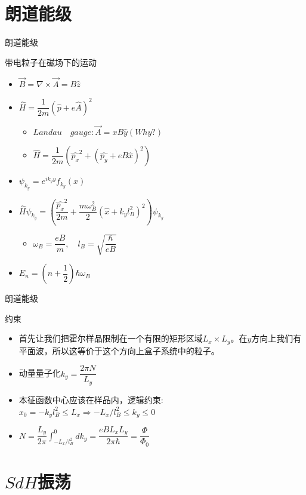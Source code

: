 \documentclass{beamer}
\begin{document}
\section{朗道能级}
\begin{frame}{朗道能级}
	\begin{block}{带电粒子在磁场下的运动}
		\begin{itemize}
			\item $\vec{B}=\nabla \times \vec{A}=B\hat{z}$
			\item $\hat{H}=\dfrac{1}{2m}(\hat{p}+e\hat{A})^{2}$
			\begin{itemize}
				\item $Landau\quad gauge:\vec{A}=xB\hat{y}(Why?)$
				\item $\hat{H}=\dfrac{1}{2m}(\hat{p_{x}}^{2}+(\hat{p_{y}}+eB\hat{x})^{2})$
			\end{itemize}
		\item $\psi_{k_{y}}=e^{ik_{y}y}f_{k_{y}}(x)$
		\item $\hat{H}\psi_{k_{y}}=(\dfrac{\hat{p_{x}}^{2}}{2m}+\dfrac{m\omega_{B}^{2}}{2}(\hat{x}+k_{y}l_{B}^{2})^{2})\psi_{k_{y}}$
		\begin{itemize}
			\item $\omega_{B}=\dfrac{eB}{m},\quad l_{B}=\sqrt{\dfrac{\hbar}{eB}}$
		\end{itemize}
	\item $E_{n}=(n+\dfrac{1}{2})\hbar\omega_{B}$
		\end{itemize}
	\end{block}
\end{frame}
\begin{frame}{朗道能级}
	\begin{block}{约束}
		\begin{itemize}
			\item 首先让我们把霍尔样品限制在一个有限的矩形区域$L_{x}\times L_{y}$。在$y$方向上我们有平面波，所以这等价于这个方向上盒子系统中的粒子。
			\item 动量量子化$k_{y}=\dfrac{2\pi N}{L_{y}}$
			\item 本征函数中心应该在样品内，逻辑约束:\\$x_{0}=-k_{y}l_{B}^{2}\le L_{x}\Rightarrow -L_{x}/l_{B}^{2}\le k_{y}\le 0$
			\item $N=\dfrac{L_{y}}{2\pi}\int_{-L_{x}/l_{B}^{2}}^{0}dk_{y}=\dfrac{eBL_{x}L_{y}}{2\pi \hbar}=\dfrac{\Phi}{\Phi_{0}}$
		\end{itemize}
	\end{block}
\end{frame}
\section{$SdH$振荡}
\end{document}
